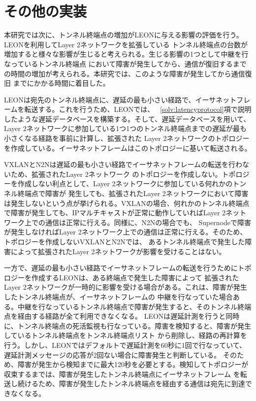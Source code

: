 \section{その他の実装}

本研究では次に、トンネル終端点の増加がLEONに与える影響の評価を行う。LEONを利用してLayer 2ネットワークを拡張している
トンネル終端点の台数が増加すると様々な影響が生じると考えられる。生じる影響の1つとして中継を行なっているトンネル終端点
において障害が発生してから、通信が復旧するまでの時間の増加が考えられる。本研究では、このような障害が発生してから通信復旧
までにかかる時間に着目した。

LEONは宛先のトンネル終端点に、遅延の最も小さい経路で、イーサネットフレームを転送する。これを行うため、LEONでは、
~\ref{solv:latencyprotocol}項で説明したような遅延データベースを構築する。そして、遅延データベースを用いて、
Layer 2ネットワークに参加している1つ1つのトンネル終端点までの遅延が最も小さくなる経路を事前に計算し、拡張された
Layer 2ネットワークのトポロジーを作成している。イーサネットフレームはこのトポロジーに基いて転送される。

VXLANとN2Nは遅延の最も小さい経路でイーサネットフレームの転送を行わないため、拡張されたLayer 2ネットワーク
のトポロジーを作成しない。トポロジーを作成しない利点として、Layer 2ネットワークに参加している何れかのトンネル終端点で障害が
発生しても、拡張されたLayer 2ネットワークにおいて障害は発生しないという点が挙げられる。VXLANの場合、何れかのトンネル終端点
で障害が発生しても、IPマルチキャストが正常に動作していればLayer 2ネットワーク上での通信は正常に行える。同様に、N2Nの場合でも、
Supernodeで障害が発生しなければLayer 2ネットワーク上での通信は正常に行える。そのため、トポロジーを作成しないVXLANとN2Nでは、
あるトンネル終端点で発生した障害によって拡張されたLayer 2ネットワークが影響を受けることはない。

一方で、遅延の最も小さい経路でイーサネットフレームの転送を行うためにトポロジーを作成するLEONは、ある終端点で発生した障害によって
拡張されたLayer 2ネットワークが一時的に影響を受ける場合がある。これは、障害が発生したトンネル終端点が、イーサネットフレームの
中継を行なっていた場合ある。中継を行なっているトンネル終端点で障害が発生すると、そのトンネル終端点を経由する経路が全て利用できなくなる。
LEONは遅延計測を行うと同時に、トンネル終端点の死活監視も行なっている。障害を検知すると、障害が発生しているトンネル終端点をトンネル終端点リスト
から削除し、経路の再計算を行う。しかし、LEONではデフォルトで遅延計測を60秒に1回で行なっていて、遅延計測メッセージの応答が2回ない場合に障害発生と判断している。
そのため、障害が発生から検知までに最大120秒を必要とする。検知してトポロジーが収束するまでは、障害が発生したトンネル終端点にイーサネットフレーム
を転送し続けるため、障害が発生したトンネル終端点を経由する通信は宛先に到達できなくなる。


